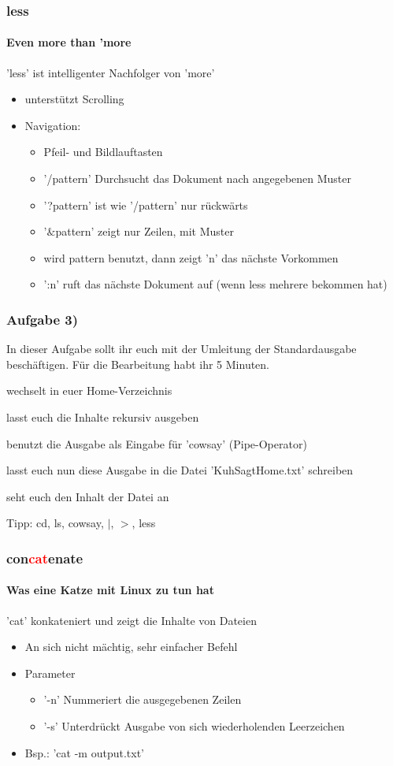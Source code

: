 \documentclass[12pt,utf8]{beamer}
\begin{document}
\begin{frame}
\frametitle{less}
\framesubtitle{Even more than 'more}
'less' ist intelligenter Nachfolger von 'more'
\begin{itemize}
	\item unterstützt Scrolling
	\item Navigation:
	\begin{itemize}[<+->]
		\item Pfeil- und Bildlauftasten
		\item '/pattern' Durchsucht das Dokument nach angegebenen Muster
		\item '?pattern' ist wie '/pattern' nur rückwärts
		\item '$\&$pattern' zeigt nur Zeilen, mit Muster
		\item wird pattern benutzt, dann zeigt 'n' das nächste Vorkommen
		\item ':n' ruft das nächste Dokument auf (wenn less mehrere bekommen hat)
	\end{itemize}
\end{itemize}
\end{frame}

\begin{frame}
\frametitle{Aufgabe 3)}
In dieser Aufgabe sollt ihr euch mit der Umleitung der Standardausgabe beschäftigen. Für die Bearbeitung habt ihr 5 Minuten.
\begin{itemize}
	{\footnotesize
	\item wechselt in euer Home-Verzeichnis
	\item lasst euch die Inhalte rekursiv ausgeben
	\item benutzt die Ausgabe als Eingabe für 'cowsay' (Pipe-Operator)
	\item lasst euch nun diese Ausgabe in die Datei 'KuhSagtHome.txt' schreiben
	\item seht euch den Inhalt der Datei an
	}
\end{itemize}
{\scriptsize Tipp: cd, ls, cowsay, $\mid$, $>$, less}
\end{frame}

\begin{frame}
\frametitle{con\textcolor{red}{cat}enate}
\framesubtitle{Was eine Katze mit Linux zu tun hat}
'cat' konkateniert und zeigt die Inhalte von Dateien
\begin{itemize}[<+->]
	\item An sich nicht mächtig, sehr einfacher Befehl
	\item Parameter
	\begin{itemize}
		\item '-n' Nummeriert die ausgegebenen Zeilen 
		\item '-s' Unterdrückt Ausgabe von sich wiederholenden Leerzeichen
	\end{itemize}
	\item Bsp.: 'cat -m output.txt'
\end{itemize}
\end{frame}
\end{document}
